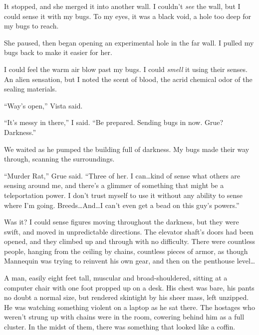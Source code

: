 It stopped, and she merged it into another wall.  I couldn't \emph{see} the wall, but I could sense it with my bugs.  To my eyes, it was a black void, a hole too deep for my bugs to reach.



She paused, then began opening an experimental hole in the far wall.  I pulled my bugs back to make it easier for her.



I could feel the warm air blow past my bugs.  I could \emph{smell} it using their senses.  An alien sensation, but I noted the scent of blood, the acrid chemical odor of the sealing materials.



``Way's open,'' Vista said.



``It's messy in there,'' I said.  ``Be prepared.  Sending bugs in now.  Grue?  Darkness.''



We waited as he pumped the building full of darkness.  My bugs made their way through, scanning the surroundings.



``Murder Rat,'' Grue said.  ``Three of her.  I can\ldots kind of sense what others are sensing around me, and there's a glimmer of something that might be a teleportation power.  I don't trust myself to use it without any ability to sense where I'm going.  Breeds\ldots And\ldots I can't even get a bead on this guy's powers.''



Was it?  I could sense figures moving throughout the darkness, but they were swift, and moved in unpredictable directions.  The elevator shaft's doors had been opened, and they climbed up and through with no difficulty.  There were countless people, hanging from the ceiling by chains, countless pieces of armor, as though Mannequin was trying to reinvent his own gear, and then on the penthouse level\ldots



A man, easily eight feet tall, muscular and broad-shouldered, sitting at a computer chair with one foot propped up on a desk.  His chest was bare, his pants no doubt a normal size, but rendered skintight by his sheer mass, left unzipped.  He was watching something violent on a laptop as he sat there.  The hostages who weren't strung up with chains were in the room, cowering behind him as a full cluster.  In the midst of them, there was something that looked like a coffin.



